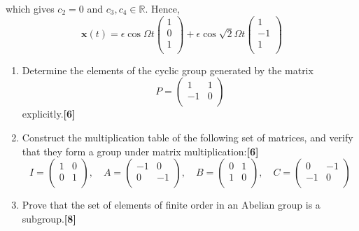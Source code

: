 \documentclass[a4paper]{article}
\begin{document}
\begin{ans}
\begin{enumerate}[label=(\alph*)]
which gives $c_2=0$ and $c_3,c_4\in\mathbb{R}$. Hence,
$$\mathbf{x}(t)=\epsilon\cos\Omega t\begin{pmatrix}1\\0\\1\\\end{pmatrix}+\epsilon\cos\sqrt{2}\Omega t\begin{pmatrix}1\\-1\\1\\\end{pmatrix}$$
\end{enumerate}
\end{ans}
\newpage
\begin{qns}\leavevmode
\begin{enumerate}[label=(\alph*)]
\item Determine the elements of the cyclic group generated by the matrix
$$P=\begin{pmatrix}1&1\\-1&0\\\end{pmatrix}$$
explicitly.\hfill\textbf{[6]}
\item Construct the multiplication table of the following set of matrices, and verify that they form a group under matrix multiplication:\hfill\textbf{[6]}
$$I=\begin{pmatrix}1&0\\0&1\\\end{pmatrix},\quad A=\begin{pmatrix}-1&0\\0&-1\\\end{pmatrix},\quad B=\begin{pmatrix}0&1\\1&0\\\end{pmatrix},\quad C=\begin{pmatrix}0&-1\\-1&0\\\end{pmatrix}$$
\item Prove that the set of elements of finite order in an Abelian group is a subgroup.\hfill\textbf{[8]}
\end{enumerate}
\end{qns}
\end{document}
